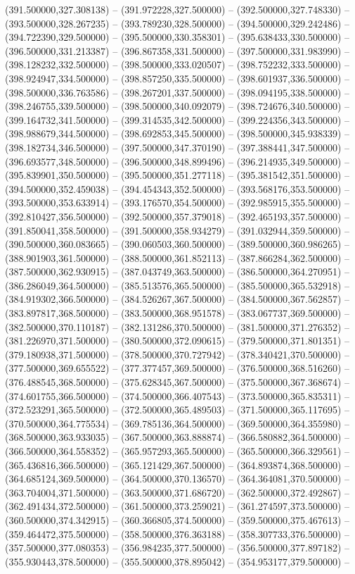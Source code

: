 (391.500000,327.308138) -- (391.972228,327.500000) -- (392.500000,327.748330) -- (393.500000,328.267235) -- (393.789230,328.500000) -- (394.500000,329.242486) -- (394.722390,329.500000) -- (395.500000,330.358301) -- (395.638433,330.500000) -- (396.500000,331.213387) -- (396.867358,331.500000) -- (397.500000,331.983990) -- (398.128232,332.500000) -- (398.500000,333.020507) -- (398.752232,333.500000) -- (398.924947,334.500000) -- (398.857250,335.500000) -- (398.601937,336.500000) -- (398.500000,336.763586) -- (398.267201,337.500000) -- (398.094195,338.500000) -- (398.246755,339.500000) -- (398.500000,340.092079) -- (398.724676,340.500000) -- (399.164732,341.500000) -- (399.314535,342.500000) -- (399.224356,343.500000) -- (398.988679,344.500000) -- (398.692853,345.500000) -- (398.500000,345.938339) -- (398.182734,346.500000) -- (397.500000,347.370190) -- (397.388441,347.500000) -- (396.693577,348.500000) -- (396.500000,348.899496) -- (396.214935,349.500000) -- (395.839901,350.500000) -- (395.500000,351.277118) -- (395.381542,351.500000) -- (394.500000,352.459038) -- (394.454343,352.500000) -- (393.568176,353.500000) -- (393.500000,353.633914) -- (393.176570,354.500000) -- (392.985915,355.500000) -- (392.810427,356.500000) -- (392.500000,357.379018) -- (392.465193,357.500000) -- (391.850041,358.500000) -- (391.500000,358.934279) -- (391.032944,359.500000) -- (390.500000,360.083665) -- (390.060503,360.500000) -- (389.500000,360.986265) -- (388.901903,361.500000) -- (388.500000,361.852113) -- (387.866284,362.500000) -- (387.500000,362.930915) -- (387.043749,363.500000) -- (386.500000,364.270951) -- (386.286049,364.500000) -- (385.513576,365.500000) -- (385.500000,365.532918) -- (384.919302,366.500000) -- (384.526267,367.500000) -- (384.500000,367.562857) -- (383.897817,368.500000) -- (383.500000,368.951578) -- (383.067737,369.500000) -- (382.500000,370.110187) -- (382.131286,370.500000) -- (381.500000,371.276352) -- (381.226970,371.500000) -- (380.500000,372.090615) -- (379.500000,371.801351) -- (379.180938,371.500000) -- (378.500000,370.727942) -- (378.340421,370.500000) -- (377.500000,369.655522) -- (377.377457,369.500000) -- (376.500000,368.516260) -- (376.488545,368.500000) -- (375.628345,367.500000) -- (375.500000,367.368674) -- (374.601755,366.500000) -- (374.500000,366.407543) -- (373.500000,365.835311) -- (372.523291,365.500000) -- (372.500000,365.489503) -- (371.500000,365.117695) -- (370.500000,364.775534) -- (369.785136,364.500000) -- (369.500000,364.355980) -- (368.500000,363.933035) -- (367.500000,363.888874) -- (366.580882,364.500000) -- (366.500000,364.558352) -- (365.957293,365.500000) -- (365.500000,366.329561) -- (365.436816,366.500000) -- (365.121429,367.500000) -- (364.893874,368.500000) -- (364.685124,369.500000) -- (364.500000,370.136570) -- (364.364081,370.500000) -- (363.704004,371.500000) -- (363.500000,371.686720) -- (362.500000,372.492867) -- (362.491434,372.500000) -- (361.500000,373.259021) -- (361.274597,373.500000) -- (360.500000,374.342915) -- (360.366805,374.500000) -- (359.500000,375.467613) -- (359.464472,375.500000) -- (358.500000,376.363188) -- (358.307733,376.500000) -- (357.500000,377.080353) -- (356.984235,377.500000) -- (356.500000,377.897182) -- (355.930443,378.500000) -- (355.500000,378.895042) -- (354.953177,379.500000) -- 